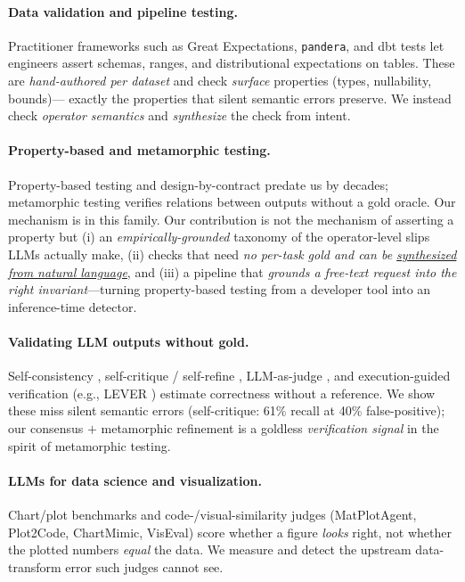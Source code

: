 \documentclass[10pt,twocolumn,letterpaper]{article}
\begin{document}
\paragraph{Data validation and pipeline testing.} Practitioner frameworks such
as Great Expectations, \texttt{pandera}, and dbt tests
\cite{gx2020,pandera2020} let engineers assert schemas, ranges, and
distributional expectations on tables. These are \emph{hand-authored per
dataset} and check \emph{surface} properties (types, nullability, bounds)---
exactly the properties that silent semantic errors preserve. We instead check
\emph{operator semantics} and \emph{synthesize} the check from intent.

\paragraph{Property-based and metamorphic testing.} Property-based testing
\cite{claessen2000quickcheck} and design-by-contract \cite{meyer1992dbc} predate
us by decades; metamorphic testing \cite{chen1998metamorphic} verifies relations
between outputs without a gold oracle. Our mechanism is in this family. Our
contribution is not the mechanism of asserting a property but (i) an
\emph{empirically-grounded} taxonomy of the operator-level slips LLMs actually
make, (ii) checks that need \emph{no per-task gold and can be
\underline{synthesized from natural language}}, and (iii) a pipeline that
\emph{grounds a free-text request into the right invariant}---turning
property-based testing from a developer tool into an inference-time detector.

\paragraph{Validating LLM outputs without gold.} Self-consistency
\cite{wang2023selfconsistency}, self-critique / self-refine
\cite{madaan2023selfrefine}, LLM-as-judge \cite{zheng2023judge}, and
execution-guided verification (e.g., LEVER \cite{ni2023lever}) estimate
correctness without a reference. We show these miss silent semantic errors
(self-critique: 61\% recall at 40\% false-positive); our consensus $+$
metamorphic refinement is a goldless \emph{verification signal} in the spirit of
metamorphic testing.

\paragraph{LLMs for data science and visualization.} Chart/plot benchmarks and
code-/visual-similarity judges (MatPlotAgent, Plot2Code, ChartMimic, VisEval)
\cite{yang2024matplotbench,wu2024plot2code,shi2024chartmimic,chen2024viseval}
score whether a figure \emph{looks} right, not whether the plotted numbers
\emph{equal} the data. We measure and detect the upstream data-transform error
such judges cannot see.
\end{document}
